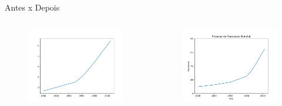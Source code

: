 %
%
\begin{frame}[t, fragile]{Antes x Depois}
  \begin{columns}
    \begin{column}{0.5\textwidth}
      \begin{figure}
        \includegraphics[scale=.35]{aula-2/figuras/matplotlib-customization-1.png}
      \end{figure}
    \end{column}

    \begin{column}{0.5\textwidth}
      \begin{figure}
        \includegraphics[scale=.35]{aula-2/figuras/matplotlib-customization-6.png}
      \end{figure}
    \end{column}
  \end{columns} 
\end{frame}

